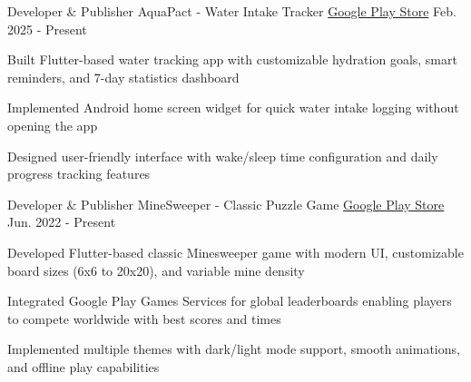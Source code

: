 
\begin{cventries}

  \cventry
    {Developer \& Publisher} %
    {AquaPact - Water Intake Tracker} %
    {\href{https://play.google.com/store/apps/details?id=org.zp1ke.aquapact}{Google Play Store}} %
    {Feb. 2025 - Present} %
    {
      \begin{cvitems} %
        \item {Built Flutter-based water tracking app with customizable hydration goals, smart reminders, and 7-day statistics dashboard}
        \item {Implemented Android home screen widget for quick water intake logging without opening the app}
        \item {Designed user-friendly interface with wake/sleep time configuration and daily progress tracking features}
      \end{cvitems}
    }

  \cventry
    {Developer \& Publisher} %
    {MineSweeper - Classic Puzzle Game} %
    {\href{https://play.google.com/store/apps/details?id=com.h4j4x.minesweeper}{Google Play Store}} %
    {Jun. 2022 - Present} %
    {
      \begin{cvitems} %
        \item {Developed Flutter-based classic Minesweeper game with modern UI, customizable board sizes (6x6 to 20x20), and variable mine density}
        \item {Integrated Google Play Games Services for global leaderboards enabling players to compete worldwide with best scores and times}
        \item {Implemented multiple themes with dark/light mode support, smooth animations, and offline play capabilities}
      \end{cvitems}
    }


\end{cventries}
